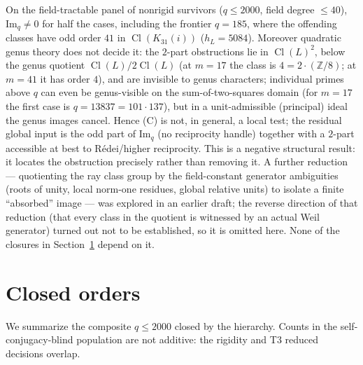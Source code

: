 \documentclass[11pt]{article}
\theoremstyle{plain}
\theoremstyle{definition}
\theoremstyle{remark}
\newcommand{\Z}{\mathbb Z}
\newcommand{\Cl}{\operatorname{Cl}}
\begin{document}
On the field-tractable panel of nonrigid survivors ($q\le2000$, field degree
$\le40$), $\mathrm{Im}_q\ne0$ for half the cases, including the frontier
$q=185$, where the offending classes have odd order $41$ in $\Cl(K_{31}(i))$
($h_L=5084$). Moreover quadratic genus theory does not decide it: the $2$-part
obstructions lie in $\Cl(L)^2$, below the genus quotient $\Cl(L)/2\Cl(L)$
(at $m=17$ the class is $4=2\cdot(\Z/8)$; at $m=41$ it has order $4$), and are
invisible to genus characters; individual primes above $q$ can even be
genus-visible on the sum-of-two-squares domain (for $m=17$ the first case is
$q=13837=101\cdot137$), but in a unit-admissible (principal) ideal the genus
images cancel. Hence (C) is not, in general, a local test; the residual global
input is the odd part of $\mathrm{Im}_q$ (no reciprocity handle) together with a
$2$-part accessible at best to R\'edei/higher reciprocity. This is a negative
structural result: it locates the obstruction precisely rather than removing it.
A further reduction --- quotienting the ray class group by the field-constant
generator ambiguities (roots of unity, local norm-one residues, global relative
units) to isolate a finite ``absorbed'' image --- was explored in an earlier
draft; the reverse direction of that reduction (that every class in the
quotient is witnessed by an actual Weil generator) turned out not to be
established, so it is omitted here. None of the closures in
Section~\ref{sec:results} depend on it.

\section{Closed orders}\label{sec:results}

We summarize the composite $q\le2000$ closed by the hierarchy. Counts in the
self-conjugacy-blind population are not additive: the rigidity and T3 reduced
decisions overlap.
\end{document}

